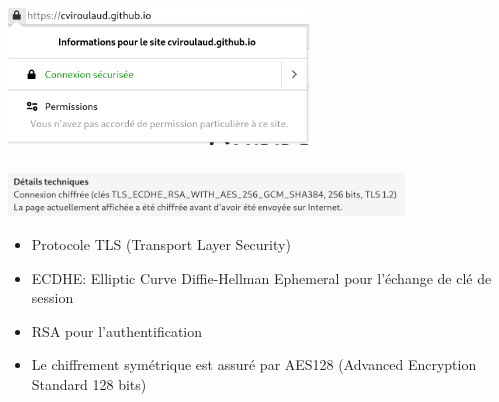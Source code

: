 \documentclass[svgnames,11pt]{beamer}
\begin{document}
\begin{frame}
    \frametitle{}

    \begin{center}
    \centering
    \includegraphics[width=8cm]{ressources/cadenas.png}
    \label{IMG}
    \end{center}

\end{frame}
\begin{frame}
    \frametitle{}

    \begin{center}
    \centering
    \includegraphics[width=10.5cm]{ressources/chiffrement.png}
    \label{IMG}
    \end{center}
\begin{itemize}
    \item Protocole TLS (Transport Layer Security)
    \item ECDHE: Elliptic Curve Diffie-Hellman Ephemeral pour l'échange de clé de session
    \item RSA pour l'authentification
    \item Le chiffrement symétrique est assuré par AES128 (Advanced Encryption Standard 128 bits)
\end{itemize}
\end{frame}
\end{document}
